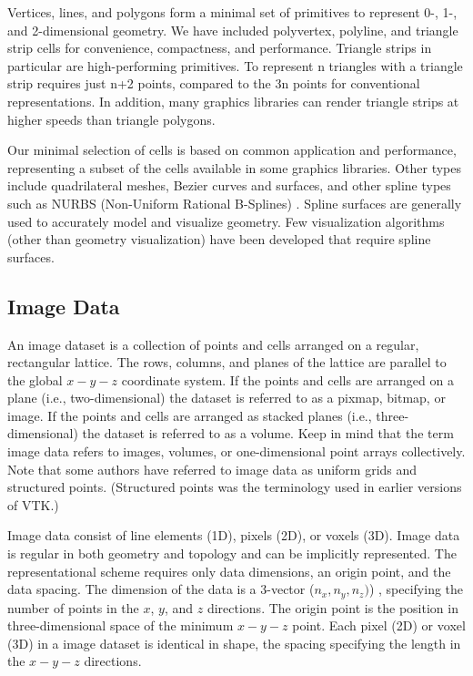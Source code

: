 Vertices, lines, and polygons form a minimal set of primitives to represent 0-, 1-, and 2-dimensional geometry. We have included polyvertex, polyline, and triangle strip cells for convenience, compactness, and performance. Triangle strips in particular are high-performing primitives. To represent n triangles with a triangle strip requires just n+2 points, compared to the 3n points for conventional representations. In addition, many graphics libraries can render triangle strips at higher speeds than triangle polygons.

Our minimal selection of cells is based on common application and performance, representing a subset of the cells available in some graphics libraries. Other types include quadrilateral meshes, Bezier curves and surfaces, and other spline types such as NURBS (Non-Uniform Rational B-Splines) \cite{Mortenson85}. Spline surfaces are generally used to accurately model and visualize geometry. Few visualization algorithms (other than geometry visualization) have been developed that require spline surfaces.

\subsection{Image Data}

An image dataset is a collection of points and cells arranged on a regular, rectangular lattice. The rows, columns, and planes of the lattice are parallel to the global $x-y-z$ coordinate system. If the points and cells are arranged on a plane (i.e., two-dimensional) the dataset is referred to as a pixmap, bitmap, or image. If the points and cells are arranged as stacked planes (i.e., three-dimensional) the dataset is referred to as a volume. Keep in mind that the term image data refers to images, volumes, or one-dimensional point arrays collectively. Note that some authors have referred to image data as uniform grids and structured points. (Structured points was the terminology used in earlier versions of VTK.)

Image data consist of line elements (1D), pixels (2D), or voxels (3D). Image data is regular in both geometry and topology and can be implicitly represented. The representational scheme requires only data dimensions, an origin point, and the data spacing. The dimension of the data is a 3-vector ($n_x,n_y,n_z)$) , specifying the number of points in the $x$, $y$, and $z$ directions. The origin point is the position in three-dimensional space of the minimum $x-y-z$ point. Each pixel (2D) or voxel (3D) in a image dataset is identical in shape, the spacing specifying the length in the $x-y-z$ directions.

